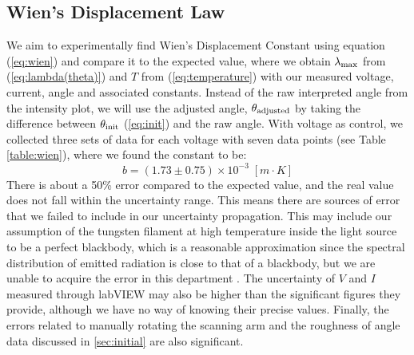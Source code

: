 \documentclass[12pt]{article}
\begin{document}
\subsection{Wien's Displacement Law} \label{sec:wien}
We aim to experimentally find Wien's Displacement Constant using equation (\ref{eq:wien}) and compare it to the expected value, where we obtain $\lambda_{\rm max}$ from (\ref{eq:lambda(theta)}) and $T$ from (\ref{eq:temperature}) with our measured voltage, current, angle and associated constants. Instead of the raw interpreted angle from the intensity plot, we will use the adjusted angle, $\theta_{\rm adjusted}$ by taking the difference between $\theta_{\rm init}$ (\ref{eq:init}) and the raw angle. With voltage as control, we collected three sets of data for each voltage with seven data points (see Table \ref{table:wien}), where we found the constant to be:
\begin{equation}
    b=(1.73 \pm 0.75) \times 10^{-3}\;[m\cdot K]
    \label{eq:b}
\end{equation}
There is about a 50\% error compared to the expected value, and the real value does not fall within the uncertainty range. This means there are sources of error that we failed to include in our uncertainty propagation. This may include our assumption of the tungsten filament at high temperature inside the light source to be a perfect blackbody, which is a reasonable approximation since the spectral distribution of emitted radiation is close to that of a blackbody, but we are unable to acquire the error in this department \autocite{10.1119/1.4802873}. The uncertainty of $V$ and $I$ measured through labVIEW may also be higher than the significant figures they provide, although we have no way of knowing their precise values. Finally, the errors related to manually rotating the scanning arm and the roughness of angle data discussed in \ref{sec:initial} are also significant.
\end{document}
